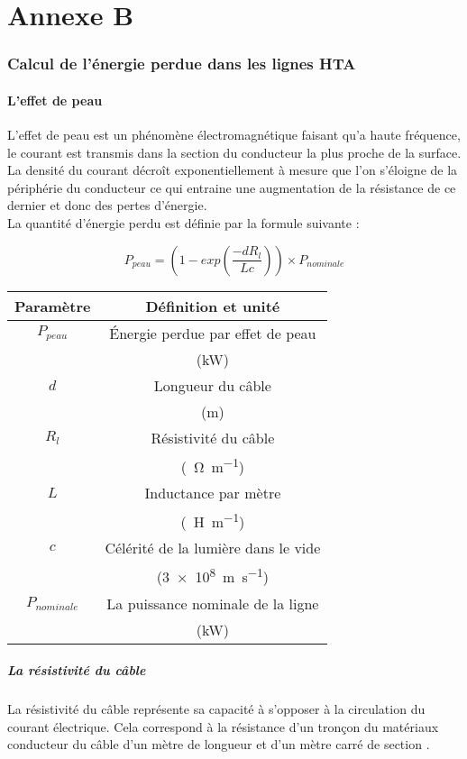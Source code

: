 \part*{Annexe B}
\section{Calcul de l'énergie perdue dans les lignes HTA}
\label{appendix:aclosses}
\subsection{L'effet de peau}
L'effet de peau est un phénomène électromagnétique faisant qu'a haute fréquence, le courant est transmis dans la section du conducteur la plus proche de la surface. La densité du courant décroît exponentiellement à mesure que l'on s'éloigne de la périphérie du conducteur ce qui entraine une augmentation de la résistance de ce dernier et donc des pertes d'énergie.\\

La quantité d'énergie perdu est définie par la formule suivante :

\[P_{peau}=(1 - exp(\frac{-dR_l}{Lc})) \times P_{nominale} \]

\begin{center}
	\begin{tabular}{|c|c|}
		\hline 
		Paramètre & Définition et unité \\
		\hline
		$P_{peau}$ & Énergie perdue par effet de peau \\ 
		& (kW) \\
		\hline
		$d$ & Longueur du câble \\
		& (m) \\	
		\hline	
		$R_l$ & Résistivité du câble \\
		& (\SI[per-mode = symbol]{}{\ohm\per\m}) \\
		\hline
		$L$ & Inductance par mètre \\
		& (\SI[per-mode = symbol]{}{\henry\per\m}) \\
		\hline
		$c$ & Célérité de la lumière dans le vide \\ 
		& (\SI[per-mode = symbol]{3e8}{\m\per\s}) \\
		\hline
		$P_{nominale}$ & La puissance nominale de la ligne \\ 
		& (kW) \\
		\hline
	\end{tabular}
\end{center}

\subsubsection{La résistivité du câble}
La résistivité du câble représente sa capacité à s'opposer à la circulation du courant électrique. Cela correspond à la résistance d'un tronçon du matériaux conducteur du câble d'un mètre de longueur et d'un mètre carré de section \cite{Resistivite}.\\

